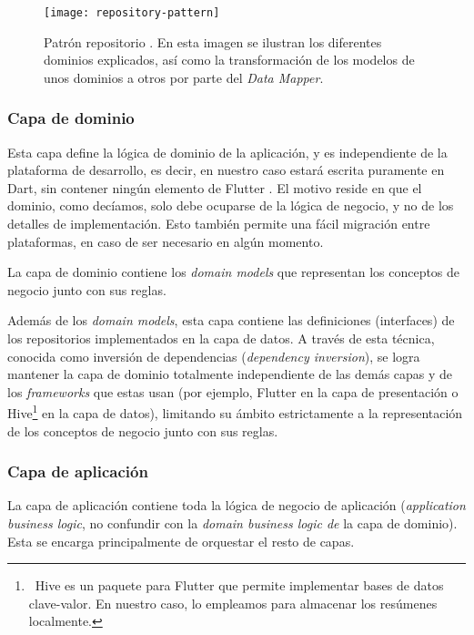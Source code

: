 \begin{figure}[!h]
	\centering
	\texttt{[image: repository-pattern]}
	\caption[Patrón repositorio.]{Patrón repositorio \cite{brandi19}. En esta imagen se ilustran los diferentes dominios explicados, así como la transformación de los modelos de unos dominios a otros por parte del \emph{Data Mapper}.}
\end{figure}

\subsubsection{Capa de dominio}

Esta capa define la lógica de dominio de la aplicación, y es independiente de la plataforma de desarrollo, es decir, en nuestro caso estará escrita puramente en Dart, sin contener ningún elemento de Flutter \cite{flutter-clean-arch}. El motivo reside en que el dominio, como decíamos, solo debe ocuparse de la lógica de negocio, y no de los detalles de implementación. Esto también permite una fácil migración entre plataformas, en caso de ser necesario en algún momento.

La capa de dominio contiene los \emph{domain models} que representan los conceptos de negocio junto con sus reglas.

Además de los \emph{domain models}, esta capa contiene las definiciones (interfaces) de los repositorios implementados en la capa de datos. A través de esta técnica, conocida como inversión de dependencias (\emph{dependency inversion}), se logra mantener la capa de dominio totalmente independiente de las demás capas y de los \emph{frameworks} que estas usan (por ejemplo, Flutter en la capa de presentación o Hive\footnote{\, Hive es un paquete para Flutter que permite implementar bases de datos clave-valor. En nuestro caso, lo empleamos para almacenar los resúmenes localmente.} en la capa de datos), limitando su ámbito estrictamente a la representación de los conceptos de negocio junto con sus reglas.

\subsubsection{Capa de aplicación}

La capa de aplicación contiene toda la lógica de negocio de aplicación (\emph{application business logic}, no confundir con la \emph{domain business logic de} la capa de dominio). Esta se encarga principalmente de orquestar el resto de capas.

